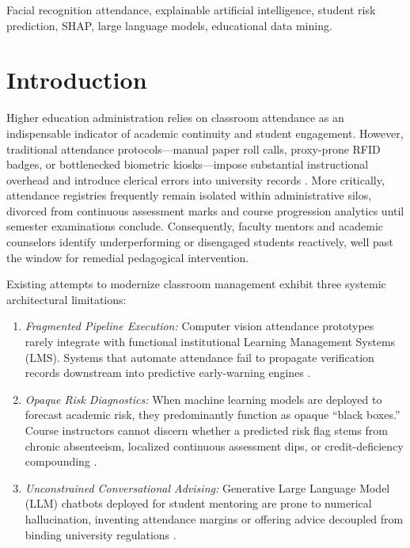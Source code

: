 \documentclass[conference]{IEEEtran}
\begin{document}
\begin{IEEEkeywords}
Facial recognition attendance, explainable artificial intelligence, student risk prediction, SHAP, large language models, educational data mining.
\end{IEEEkeywords}

\section{Introduction}
Higher education administration relies on classroom attendance as an indispensable indicator of academic continuity and student engagement. However, traditional attendance protocols—manual paper roll calls, proxy-prone RFID badges, or bottlenecked biometric kiosks—impose substantial instructional overhead and introduce clerical errors into university records \cite{gardner2018student}. More critically, attendance registries frequently remain isolated within administrative silos, divorced from continuous assessment marks and course progression analytics until semester examinations conclude. Consequently, faculty mentors and academic counselors identify underperforming or disengaged students reactively, well past the window for remedial pedagogical intervention.

Existing attempts to modernize classroom management exhibit three systemic architectural limitations:
\begin{enumerate}
    \item \textit{Fragmented Pipeline Execution:} Computer vision attendance prototypes rarely integrate with functional institutional Learning Management Systems (LMS). Systems that automate attendance fail to propagate verification records downstream into predictive early-warning engines \cite{barata2023predicting}.
    \item \textit{Opaque Risk Diagnostics:} When machine learning models are deployed to forecast academic risk, they predominantly function as opaque ``black boxes.'' Course instructors cannot discern whether a predicted risk flag stems from chronic absenteeism, localized continuous assessment dips, or credit-deficiency compounding \cite{lundberg2017unified}.
    \item \textit{Unconstrained Conversational Advising:} Generative Large Language Model (LLM) chatbots deployed for student mentoring are prone to numerical hallucination, inventing attendance margins or offering advice decoupled from binding university regulations \cite{lee2024exploring}.
\end{enumerate}
\end{document}

